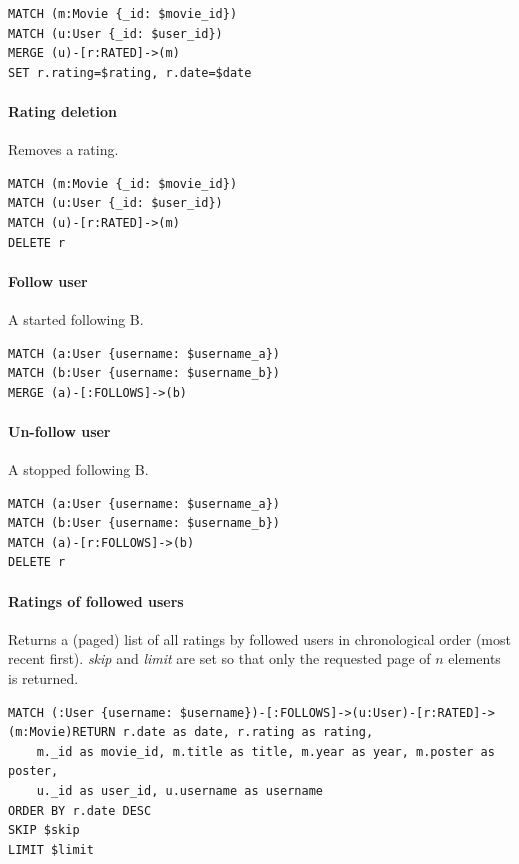 \documentclass[11pt]{article}
\begin{document}
\begin{lstlisting}[language=Cypher]
MATCH (m:Movie {_id: $movie_id})
MATCH (u:User {_id: $user_id})
MERGE (u)-[r:RATED]->(m)
SET r.rating=$rating, r.date=$date
\end{lstlisting}

\paragraph{Rating deletion} Removes a rating.

\begin{lstlisting}[language=Cypher]
MATCH (m:Movie {_id: $movie_id})
MATCH (u:User {_id: $user_id})
MATCH (u)-[r:RATED]->(m)
DELETE r
\end{lstlisting}

\paragraph{Follow user} A started following B.

\begin{lstlisting}[language=Cypher]
MATCH (a:User {username: $username_a})
MATCH (b:User {username: $username_b})
MERGE (a)-[:FOLLOWS]->(b)
\end{lstlisting}

\paragraph{Un-follow user} A stopped following B.

\begin{lstlisting}[language=Cypher]
MATCH (a:User {username: $username_a})
MATCH (b:User {username: $username_b})
MATCH (a)-[r:FOLLOWS]->(b)
DELETE r
\end{lstlisting}

\paragraph{Ratings of followed users} Returns a (paged) list of all ratings by followed users in chronological order (most recent first). \emph{skip} and \emph{limit} are set so that only the requested page of $n$ elements is returned.

\begin{lstlisting}[language=Cypher]
MATCH (:User {username: $username})-[:FOLLOWS]->(u:User)-[r:RATED]->(m:Movie)RETURN r.date as date, r.rating as rating,
    m._id as movie_id, m.title as title, m.year as year, m.poster as poster,
    u._id as user_id, u.username as username
ORDER BY r.date DESC
SKIP $skip
LIMIT $limit
\end{lstlisting}
\end{document}
